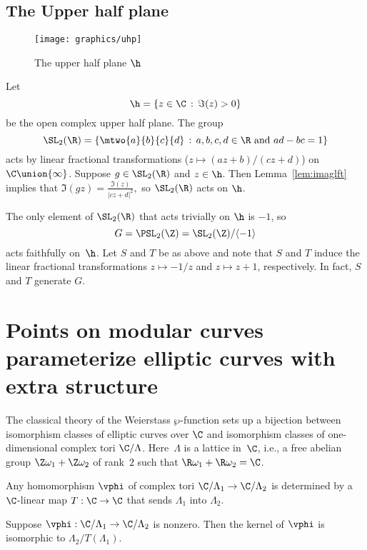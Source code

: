 \documentclass{report}
\begin{document}
\subsection{The Upper half plane}
\begin{figure}
\begin{center}
\texttt{[image: graphics/uhp]}
\caption{The upper half plane $\h$}
\end{center}
\end{figure}
Let
\[
  \h = \{z\in\C \,:\, \Im(z) > 0\}
\]
be the open complex upper half plane. The group
\[
\SL_2(\R) = \left\{ \mtwo{a}{b}{c}{d} \,:\, a,b,c,d\in\R \text{
and } ad-bc = 1\right\}
\]
acts by linear fractional transformations ($z\mapsto
(az+b)/(cz+d)$) on $\C\union\{\infty\}$.
Suppose $g\in\SL_2(\R)$ and $z\in\h$.  Then Lemma~\ref{lem:imaglft}
implies that
$
  \Im(gz) = \frac{\Im(z)}{|cz+d|^2},
$
so $\SL_2(\R)$ acts on $\h$.

The only element of $\SL_2(\R)$ that acts trivially on $\h$ is
$-1$, so $$G = \PSL_2(\Z) = \SL_2(\Z)/\langle -1 \rangle$$ acts
faithfully on~$\h$.  Let $S$ and $T$ be as above and note that $S$
and $T$ induce the linear fractional transformations $z\mapsto
-1/z$ and $z\mapsto z+1$, respectively.  In fact, $S$
and $T$ generate $G$.

\section{Points on modular curves parameterize elliptic curves with extra structure}\label{sec:modcurveparam}
The classical theory of the Weierstass $\wp$-function sets up a
bijection between isomorphism classes of elliptic curves over $\C$
and isomorphism classes of one-dimensional complex tori
$\C/\Lambda$.  Here~$\Lambda$ is a lattice in~$\C$, i.e., a free
abelian group $\Z\omega_1+\Z\omega_2$ of rank~$2$ such that
$\R\omega_1+\R\omega_2=\C$.

Any homomorphism $\vphi$ of complex tori $\C/\Lambda_1\to
\C/\Lambda_2$ is determined by a $\C$-linear map $T:\C\to \C$ that
sends $\Lambda_1$ into $\Lambda_2$.
\begin{lemma}\label{lem:ellcurvemapker} Suppose $\vphi:\C/\Lambda_1\to
\C/\Lambda_2$ is nonzero.  Then the kernel of $\vphi$ is
isomorphic to $\Lambda_2/T(\Lambda_1)$.
\end{lemma}
\end{document}
